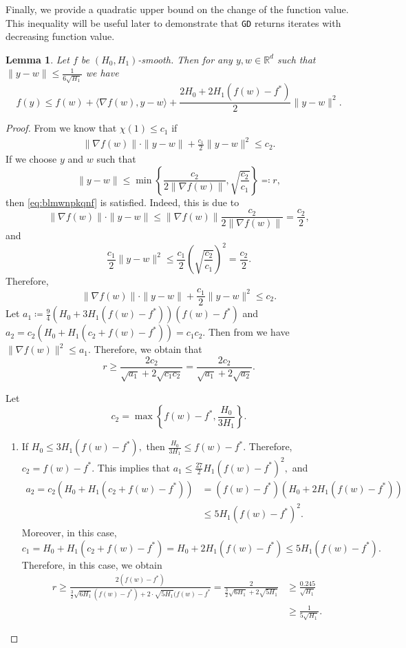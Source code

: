 \documentclass[a4paper,11pt]{article}
\newcommand{\algname}[1]{\texttt{#1}}
\newcommand{\R}{\mathbb{R}}
\newcommand{\1}{\mathbbm{1}}
\newcommand{\eqdef}{\coloneqq}
\theoremstyle{plain}
\newtheorem{lemma}{Lemma}
\begin{document}
Finally, we provide a quadratic upper bound on the change of the function value. This inequality will be useful later to demonstrate that \algname{GD} returns iterates with decreasing function value.

\begin{lemma}\label{lem:quadratic_bound} Let $f$ be $(H_0,H_1)$-smooth. Then for any $y,w\in\R^d$ such that $\|y-w\| \le \frac{1}{6\sqrt{H_1}}$ we have 
\[
f(y) \le f(w) + \langle\nabla f(w), y-w \rangle + \frac{2H_0 + 2H_1(f(w) - f^*)}{2}\|y-w\|^2.
\]
    
\end{lemma}
\begin{proof}
    From  we know that $\chi(1) \le c_1$ if 
    \begin{align}\label{eq:blmwnpkqnf}
        \|\nabla f(w)\|\cdot \|y-w\| + \frac{c_1}{2}\|y-w\|^2 \le c_2.
    \end{align}
    If we choose $y$ and $w$ such that 
    \[
    \|y-w\| \le \min\left\{\frac{c_2}{2\|\nabla f(w)\|}, \sqrt{\frac{c_2}{c_1}}\right\} \eqcolon r,
    \]
    then \eqref{eq:blmwnpkqnf} is satisfied. Indeed, this is due to
    \[
    \|\nabla f(w)\|\cdot \|y-w\| \le \|\nabla f(w)\| \frac{c_2}{2\|\nabla f(w)\|} = \frac{c_2}{2},
    \]
    and 
    \[
    \frac{c_1}{2}\|y-w\|^2 \le \frac{c_1}{2}\left(\sqrt{\frac{c_2}{c_1}}\right)^2 = \frac{c_2}{2}.
    \]
    Therefore, 
    \[
        \|\nabla f(w)\|\cdot\|y-w\| + \frac{c_1}{2}\|y-w\|^2 \le c_2.
    \]
    Let $a_1 \eqdef \frac{9}{4}(H_0 + 3H_1(f(w) - f^*))(f(w) - f^*)$ and $a_2 = c_2(H_0 + H_1(c_2 + f(w) - f^*)) = c_1c_2.$ Then from  we have $\|\nabla f(w)\|^2 \le a_1.$ Therefore, we obtain that 
    \[
    r \ge \frac{2c_2}{\sqrt{a_1} + 2\sqrt{c_1c_2}} = \frac{2c_2}{\sqrt{a_1} + 2\sqrt{a_2}}.
    \]

    
    Let 
    \[
    c_2 = \max\left\{f(w) - f^*, \frac{H_0}{3H_1}\right\}.
    \]
    \begin{enumerate}
    \item If $H_0 \le 3H_1(f(w) - f^*),$ then $\frac{H_0}{3H_1} \le f(w) - f^*$. Therefore, $c_2 = f(w) - f^*.$ This implies that $a_1 \le \frac{27}{2}H_1(f(w) - f^*)^2,$ and 
    \begin{align*}
    a_2 = c_2(H_0 + H_1(c_2 + f(w) - f^*)) &= (f(w) - f^*)(H_0 + 2H_1(f(w) - f^*)) \\
    &\le 5H_1(f(w) - f^*)^2.
    \end{align*}
    Moreover, in this case, 
    \[
    c_1 = H_0+H_1(c_2 + f(w) - f^*) = H_0 + 2H_1(f(w) - f^*) \le 5H_1(f(w)-f^*).
    \]
    Therefore, in this case, we obtain 
    \begin{align*}
    r \ge \frac{2(f(w) - f^*)}{\frac{3}{2}\sqrt{6H_1}(f(w) - f^*) + 2\cdot \sqrt{5H_1}(f(w) - f^*} = \frac{2}{\frac{3}{2}\sqrt{6H_1} + 2\sqrt{5H_1}} &\ge \frac{0.245}{\sqrt{H_1}}\\
    &\ge \frac{1}{5\sqrt{H_1}}.
    \end{align*}
    

\end{enumerate}
\end{proof}
\end{document}
